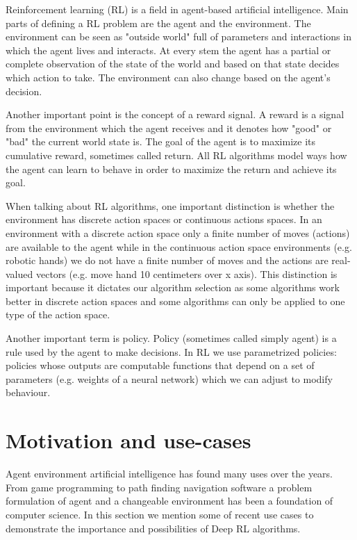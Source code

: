 \documentclass[b5paper]{book}
\let\cite\parencite
\begin{document}
Reinforcement learning (RL) is a field in agent-based artificial intelligence. \cite{russell2002artificial} Main parts of defining a RL problem are the agent and the environment. The environment can be seen as "outside world" full of parameters and interactions in which the agent lives and interacts. At every stem the agent has a partial or complete observation of the state of the world and based on that state decides which action to take. The environment can also change based on the agent's decision.

Another important point is the concept of a reward signal. A reward is a signal from the environment which the agent receives and it denotes how "good" or "bad" the current world state is. The goal of the agent is to maximize its cumulative reward, sometimes called return. All RL algorithms model ways how the agent can learn to behave in order to maximize the return and achieve its goal.

When talking about RL algorithms, one important distinction is whether the environment has discrete action spaces or continuous actions spaces. In an environment with a discrete action space only a finite number of moves (actions) are available to the agent while in the continuous action space environments (e.g. robotic hands) we do not have a finite number of moves and the actions are real-valued vectors (e.g. move hand 10 centimeters over x axis). This distinction is important because it dictates our algorithm selection as some algorithms work better in discrete action spaces and some algorithms can only be applied to one type of the action space.

Another important term is policy. Policy (sometimes called simply agent) is a rule used by the agent to make decisions. In RL we use parametrized policies: policies whose outputs are computable functions that depend on a set of parameters (e.g. weights of a neural network) which we can adjust to modify behaviour. 


\section{Motivation and use-cases} 


Agent environment artificial intelligence has found many uses over the years. From game programming to path finding navigation software a problem formulation of agent and a changeable environment has been a foundation of computer science. In this section we mention some of recent use cases to demonstrate the importance and possibilities of Deep RL algorithms.
\end{document}
